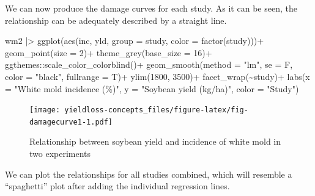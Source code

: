 \documentclass[
  letterpaper,
]{book}
\newenvironment{Shaded}{\begin{snugshade}}{\end{snugshade}}
\newcommand{\AttributeTok}[1]{\textcolor[rgb]{0.40,0.45,0.13}{#1}}
\newcommand{\DecValTok}[1]{\textcolor[rgb]{0.68,0.00,0.00}{#1}}
\newcommand{\FunctionTok}[1]{\textcolor[rgb]{0.28,0.35,0.67}{#1}}
\newcommand{\NormalTok}[1]{\textcolor[rgb]{0.00,0.23,0.31}{#1}}
\newcommand{\SpecialCharTok}[1]{\textcolor[rgb]{0.37,0.37,0.37}{#1}}
\newcommand{\StringTok}[1]{\textcolor[rgb]{0.13,0.47,0.30}{#1}}
\begin{document}
We can now produce the damage curves for each study. As it can be seen,
the relationship can be adequately described by a straight line.

\begin{Shaded}
\begin{Highlighting}[]
\NormalTok{wm2 }\SpecialCharTok{|\textgreater{}} 
  \FunctionTok{ggplot}\NormalTok{(}\FunctionTok{aes}\NormalTok{(inc, yld, }
             \AttributeTok{group =}\NormalTok{ study, }
             \AttributeTok{color =} \FunctionTok{factor}\NormalTok{(study)))}\SpecialCharTok{+}
  \FunctionTok{geom\_point}\NormalTok{(}\AttributeTok{size =} \DecValTok{2}\NormalTok{)}\SpecialCharTok{+}
   \FunctionTok{theme\_grey}\NormalTok{(}\AttributeTok{base\_size =} \DecValTok{16}\NormalTok{)}\SpecialCharTok{+}
\NormalTok{  ggthemes}\SpecialCharTok{::}\FunctionTok{scale\_color\_colorblind}\NormalTok{()}\SpecialCharTok{+}
  \FunctionTok{geom\_smooth}\NormalTok{(}\AttributeTok{method =} \StringTok{"lm"}\NormalTok{, }\AttributeTok{se =}\NormalTok{ F, }\AttributeTok{color =} \StringTok{"black"}\NormalTok{, }\AttributeTok{fullrange =}\NormalTok{ T)}\SpecialCharTok{+}
  \FunctionTok{ylim}\NormalTok{(}\DecValTok{1800}\NormalTok{, }\DecValTok{3500}\NormalTok{)}\SpecialCharTok{+}
  \FunctionTok{facet\_wrap}\NormalTok{(}\SpecialCharTok{\textasciitilde{}}\NormalTok{study)}\SpecialCharTok{+}
  \FunctionTok{labs}\NormalTok{(}\AttributeTok{x =} \StringTok{"White mold incidence (\%)"}\NormalTok{,}
       \AttributeTok{y =} \StringTok{"Soybean yield (kg/ha)"}\NormalTok{,}
       \AttributeTok{color =} \StringTok{"Study"}\NormalTok{)}
\end{Highlighting}
\end{Shaded}

\begin{figure}

\texttt{[image: yieldloss-concepts\_files/figure-latex/fig-damagecurve1-1.pdf]} \hfill{}

\caption{\label{fig-damagecurve1}Relationship between soybean yield and
incidence of white mold in two experiments}

\end{figure}

We can plot the relationships for all studies combined, which will
resemble a ``spaghetti'' plot after adding the individual regression
lines.
\end{document}

